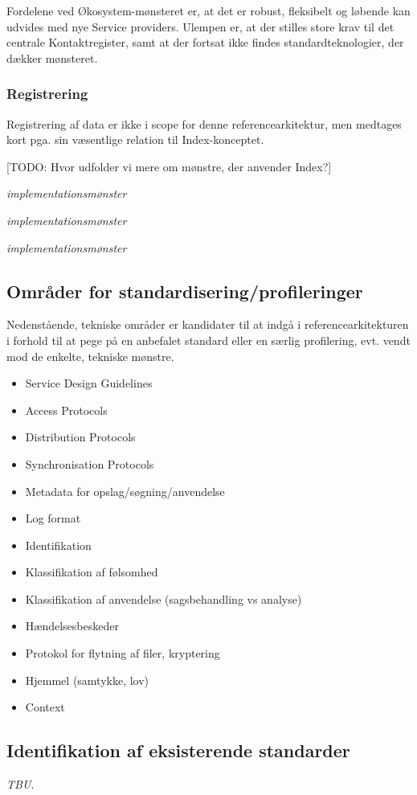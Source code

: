 Fordelene ved Økosystem-mønsteret er, at det er robust, fleksibelt og
løbende kan udvides med nye Service providers. Ulempen er, at der
stilles store krav til det centrale Kontaktregister, samt at der fortsat
ikke findes standardteknologier, der dækker mønsteret.

\subsubsection{Registrering}\label{registrering}

Registrering af data er ikke i scope for denne referencearkitektur, men
medtages kort pga. sin væsentlige relation til Index-konceptet.

{[}TODO: Hvor udfolder vi mere om mønstre, der anvender Index?{]}

\begin{description}
\tightlist
\item[Ansvar hos registrant]
\emph{implementationsmønster}
\item[Ansvar hos dataejer]
\emph{implementationsmønster}
\item[Ansvar hos distributør]
\emph{implementationsmønster}
\end{description}

\subsection{Områder for
standardisering/profileringer}\label{omruxe5der-for-standardiseringprofileringer}

Nedenstående, tekniske områder er kandidater til at indgå i
referencearkitekturen i forhold til at pege på en anbefalet standard
eller en særlig profilering, evt. vendt mod de enkelte, tekniske
mønstre.

\begin{itemize}
\tightlist
\item
  Service Design Guidelines
\item
  Access Protocols
\item
  Distribution Protocols
\item
  Synchronisation Protocols
\item
  Metadata for opslag/søgning/anvendelse
\item
  Log format
\item
  Identifikation
\item
  Klassifikation af følsomhed
\item
  Klassifikation af anvendelse (sagsbehandling vs analyse)
\item
  Hændelsesbeskeder
\item
  Protokol for flytning af filer, kryptering
\item
  Hjemmel (samtykke, lov)
\item
  Context
\end{itemize}

\subsection{Identifikation af eksisterende
standarder}\label{identifikation-af-eksisterende-standarder}

\emph{TBU.}

